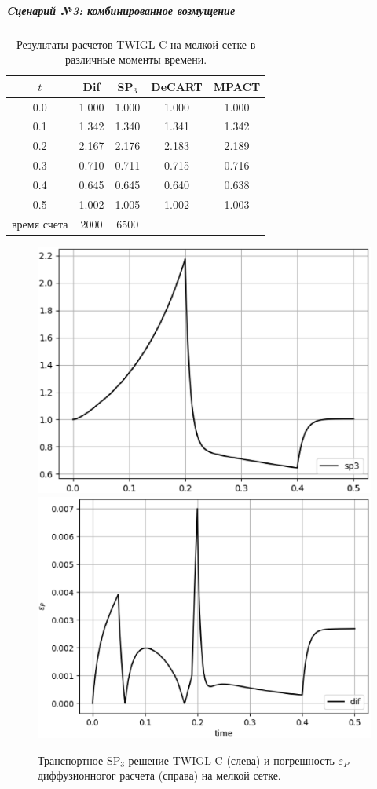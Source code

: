 \documentclass{crm-article}
\begin{document}
\subparagraph{Cценарий №3: комбинированное возмущение}
\begin{table}[htp]
\caption{Результаты расчетов TWIGL-C на мелкой сетке в различные моменты времени.}
\label{table:twigl-c}
\begin{center}
\begin{tabular}{c c c c c}
\hline
$t$ & Dif & SP$_3$ & DeCART & MPACT\\
\hline
0.0 & 1.000 & 1.000 & 1.000 & 1.000 \\
0.1 & 1.342 & 1.340 & 1.341 & 1.342 \\
0.2 & 2.167 & 2.176 & 2.183 & 2.189 \\
0.3 & 0.710 & 0.711 & 0.715 & 0.716 \\
0.4 & 0.645 & 0.645 & 0.640 & 0.638 \\
0.5 & 1.002 & 1.005 & 1.002 & 1.003 \\
\hline
время счета & 2000 & 6500 \\
\end{tabular}
\end{center}
\end{table}
\begin{figure}[ht]
\begin{center}
	\includegraphics[width=0.4\linewidth]{sp3_ref_c.eps}\hspace{20pt}
	\includegraphics[width=0.4\linewidth]{odds_c.eps}\\
	\caption{\label{image:canonsummary} Транспортное SP$_3$ решение TWIGL-C (слева) и погрешность $\varepsilon_P$ диффузионногог расчета (справа) на мелкой сетке. }
	\label{ris:sp3_ref_c}
\end{center}
\end{figure}
\end{document}
